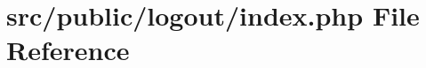 \hypertarget{logout_2index_8php}{}\section{src/public/logout/index.php File Reference}
\label{logout_2index_8php}
